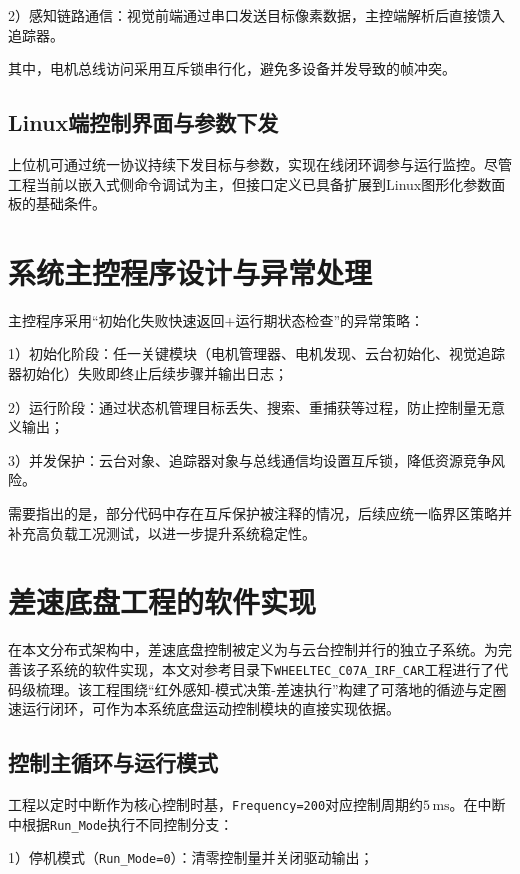 2）感知链路通信：视觉前端通过串口发送目标像素数据，主控端解析后直接馈入追踪器。

其中，电机总线访问采用互斥锁串行化，避免多设备并发导致的帧冲突。

\subsection{Linux端控制界面与参数下发}

上位机可通过统一协议持续下发目标与参数，实现在线闭环调参与运行监控。尽管工程当前以嵌入式侧命令调试为主，但接口定义已具备扩展到Linux图形化参数面板的基础条件。

\section{系统主控程序设计与异常处理}

主控程序采用“初始化失败快速返回+运行期状态检查”的异常策略：

1）初始化阶段：任一关键模块（电机管理器、电机发现、云台初始化、视觉追踪器初始化）失败即终止后续步骤并输出日志；

2）运行阶段：通过状态机管理目标丢失、搜索、重捕获等过程，防止控制量无意义输出；

3）并发保护：云台对象、追踪器对象与总线通信均设置互斥锁，降低资源竞争风险。

需要指出的是，部分代码中存在互斥保护被注释的情况，后续应统一临界区策略并补充高负载工况测试，以进一步提升系统稳定性。

\section{差速底盘工程的软件实现}

在本文分布式架构中，差速底盘控制被定义为与云台控制并行的独立子系统。为完善该子系统的软件实现，本文对参考目录下\texttt{WHEELTEC\_C07A\_IRF\_CAR}工程进行了代码级梳理。该工程围绕“红外感知-模式决策-差速执行”构建了可落地的循迹与定圈速运行闭环，可作为本系统底盘运动控制模块的直接实现依据。

\subsection{控制主循环与运行模式}

工程以定时中断作为核心控制时基，\texttt{Frequency=200}对应控制周期约\(5\,\mathrm{ms}\)。在中断中根据\texttt{Run\_Mode}执行不同控制分支：

1）停机模式（\texttt{Run\_Mode=0}）：清零控制量并关闭驱动输出；

